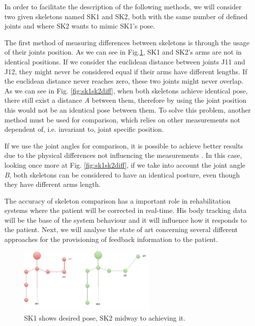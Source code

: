 In order to facilitate the description of the following methods, we will consider two given skeletons named SK1 and SK2, both with the same number of defined joints and where SK2 wants to mimic SK1's pose.

The first method of measuring differences between skeletons is through the usage of their joints position. 
As we can see in Fig.\ref{fig:sk1sk2}, SK1 and SK2's arms are not in identical positions. 
If we consider the euclidean distance between joints J11 and J12, they might never be considered equal if their arms have different lengths. 
If the euclidean distance never reaches zero, these two joints might never overlap. As we can see in Fig. \ref{fig:sk1sk2diff}, 
when both skeletons achieve identical pose, there still exist a distance \textit{A} between them, therefore by using the joint position 
this would not be an identical pose between them.
To solve this problem, another method must be used for comparison, 
which relies on other measurements not dependent of, i.e. invariant to, joint specific position. 

If we use the joint angles for comparison, it is possible to achieve better results due to 
the physical differences not influencing the measurements \cite{Borghese2013}. 
In this case, looking once more at Fig. \ref{fig:sk1sk2diff}, 
if we take into account the joint angle \textit{B}, both skeletons can be considered to have an identical posture, even though they have different arms length.

The accuracy of skeleton comparison has a important role in rehabilitation systems 
where the patient will be corrected in real-time. His body tracking data will be the 
base of the system behaviour and it will influence how it responds to the patient. 
Next, we will analyse the state of art concerning several different approaches for 
the provisioning of feedback information to the patient.


\begin{figure}[!t]
    \begin{center}
        \includegraphics[width=0.6\textwidth]{imgs/SK1SK2}
    \end{center}
	\caption{SK1 shows desired pose, SK2 midway to achieving it.}
	\label{fig:sk1sk2}
\end{figure}



